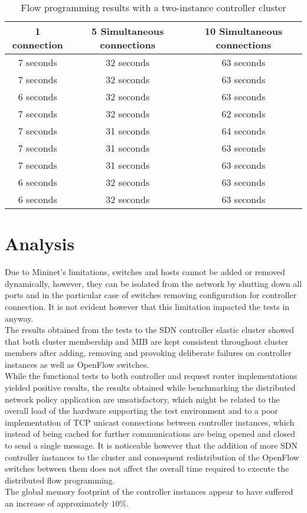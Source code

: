 \begin{table}[h!]
	\begin{center}
		\begin{tabular}{ | c | c | c | }
			\rowcolor{HeaderRowColor}
			\hline
			\textbf{1 connection} & \textbf{5 Simultaneous connections} & \textbf{10 Simultaneous connections}\\
			\hline
			7 seconds & 32 seconds & 63 seconds\\
			\hline
			7 seconds & 32 seconds & 63 seconds\\
			\hline
			6 seconds & 32 seconds & 63 seconds\\
			\hline
			7 seconds & 32 seconds & 62 seconds\\
			\hline
			7 seconds & 31 seconds & 64 seconds\\
			\hline
			7 seconds & 31 seconds & 63 seconds\\
			\hline
			7 seconds & 31 seconds & 63 seconds\\
			\hline
			6 seconds & 32 seconds & 63 seconds\\
			\hline
			6 seconds & 32 seconds & 63 seconds\\
			\hline
		\end{tabular}
		\caption{Flow programming results with a two-instance controller cluster}
		\label{table:perfomance-tests-3controllers}
	\end{center}
\end{table}
%
\section{Analysis}
\label{section:considerations}
Due to Mininet's limitations, switches and hosts cannot be added or removed dynamically, however, they can be isolated from the network by shutting down all ports and in the particular case of switches removing configuration for controller connection.
It is not evident however that this limitation impacted the tests in anyway.\\
%
The results obtained from the tests to the \gls{SDN} controller elastic cluster showed that both cluster membership and \gls{MIB} are kept consistent throughout cluster members after adding, removing and provoking deliberate failures on controller instances as well as OpenFlow switches.\\
While the functional tests to both controller and request router implementations yielded positive results, the results obtained while benchmarking the distributed network policy application are unsatisfactory, which might be related to the overall load of the hardware supporting the test environment and to a poor implementation of \gls{TCP} unicast connections between controller instances, which instead of being cached for further communications are being opened and closed to send a single message. 
It is noticeable however that the addition of more \gls{SDN} controller instances to the cluster and consequent redistribution of the OpenFlow switches between them does not affect the overall time required to execute the distributed flow programming.\\
The global memory footprint of the controller instances appear to have suffered an increase of approximately $10\%$.
 